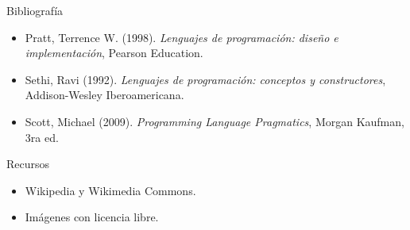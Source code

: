 \documentclass{beamer} %
\begin{document}

\begin{frame}
 \begin{block}{Bibliografía}
  \begin{itemize}
    \item Pratt, Terrence W. (1998). \textit{Lenguajes de programación: diseño e implementación}, Pearson Education.
    \item Sethi, Ravi (1992). \textit{Lenguajes de programación: conceptos y constructores}, Addison-Wesley Iberoamericana.
    \item Scott, Michael (2009). \textit{Programming Language Pragmatics}, Morgan Kaufman, 3ra ed.
  \end{itemize}
 \end{block}
 \begin{block}{Recursos}
  \begin{itemize}
    \item Wikipedia y Wikimedia Commons.
    \item Imágenes con licencia libre.
  \end{itemize}
 \end{block}
\end{frame}
\end{document}
